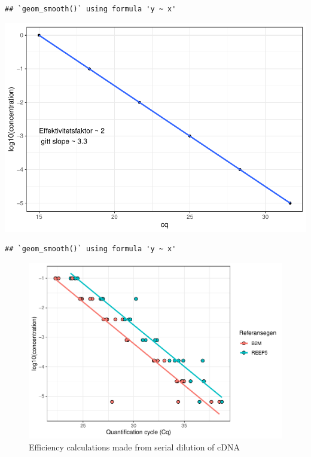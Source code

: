 \documentclass[
]{book}
\begin{document}
\begin{verbatim}
## `geom_smooth()` using formula 'y ~ x'
\end{verbatim}

\includegraphics{_main_files/figure-latex/unnamed-chunk-4-1.pdf}

\begin{verbatim}
## `geom_smooth()` using formula 'y ~ x'
\end{verbatim}

\begin{figure}
\centering
\includegraphics{_main_files/figure-latex/unnamed-chunk-5-1.pdf}
\caption{\label{fig:unnamed-chunk-5}Efficiency calculations made from serial dilution of cDNA}
\end{figure}
\end{document}
